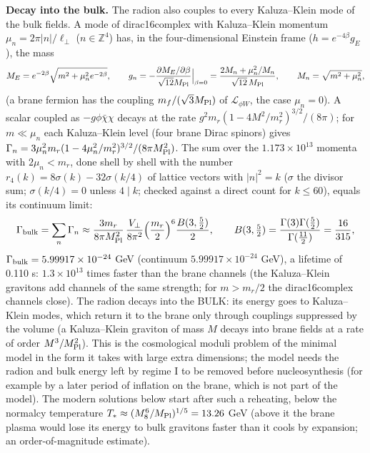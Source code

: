 \documentclass[10pt,a4paper]{article}
\begin{document}
\textbf{Decay into the bulk.} The radion also couples to every Kaluza–Klein mode of the bulk fields. A mode of dirac16complex with Kaluza–Klein momentum $\mu_n=2\pi|n|/\ell_\perp$ ($n\in\mathbb Z^4$) has, in the four-dimensional Einstein frame ($h=e^{-4\beta}g_E$), the mass
\begin{equation*}
M_E=e^{-2\beta}\sqrt{m^2+\mu_n^2e^{-2\beta}},\qquad g_n=-\frac{\partial M_E/\partial\beta}{\sqrt{12}M_{\rm Pl}}\Big|_{\beta=0}=\frac{2M_n+\mu_n^2/M_n}{\sqrt{12}\,M_{\rm Pl}},\qquad M_n=\sqrt{m^2+\mu_n^2},
\end{equation*}
(a brane fermion has the coupling $m_f/(\sqrt3M_{\rm Pl})$ of $\mathcal L_{\phi W}$, the case $\mu_n=0$). A scalar coupled as $-g\phi\bar\chi\chi$ decays at the rate $g^2m_r(1-4M^2/m_r^2)^{3/2}/(8\pi)$; for $m\ll\mu_n$ each Kaluza–Klein level (four brane Dirac spinors) gives $\Gamma_n=3\mu_n^2m_r(1-4\mu_n^2/m_r^2)^{3/2}/(8\pi M_{\rm Pl}^2)$. The sum over the $1.173\times10^{13}$ momenta with $2\mu_n<m_r$, done shell by shell with the number $r_4(k)=8\sigma(k)-32\sigma(k/4)$ of lattice vectors with $|n|^2=k$ ($\sigma$ the divisor sum; $\sigma(k/4)=0$ unless $4\mid k$; checked against a direct count for $k\le60$), equals its continuum limit:
\begin{equation*}
\Gamma_{\rm bulk}=\sum_n\Gamma_n\approx\frac{3m_r}{8\pi M_{\rm Pl}^2}\,\frac{V_\perp}{8\pi^2}\Big(\frac{m_r}2\Big)^6\frac{B(3,\tfrac52)}2,\qquad B(3,\tfrac52)=\frac{\Gamma(3)\Gamma(\tfrac52)}{\Gamma(\tfrac{11}2)}=\frac{16}{315},
\end{equation*}
$\Gamma_{\rm bulk}=5.99917\times10^{-24}$ GeV (continuum $5.99917\times10^{-24}$ GeV), a lifetime of 0.110 s: $1.3\times10^{13}$ times faster than the brane channels (the Kaluza–Klein gravitons add channels of the same strength; for $m>m_r/2$ the dirac16complex channels close). The radion decays into the BULK: its energy goes to Kaluza–Klein modes, which return it to the brane only through couplings suppressed by the volume (a Kaluza–Klein graviton of mass $M$ decays into brane fields at a rate of order $M^3/M_{\rm Pl}^2$). This is the cosmological moduli problem of the minimal model in the form it takes with large extra dimensions; the model needs the radion and bulk energy left by regime I to be removed before nucleosynthesis (for example by a later period of inflation on the brane, which is not part of the model). The modern solutions below start after such a reheating, below the normalcy temperature $T_*\approx(M_8^6/M_{\rm Pl})^{1/5}=13.26$ GeV (above it the brane plasma would lose its energy to bulk gravitons faster than it cools by expansion; an order-of-magnitude estimate).
\end{document}
